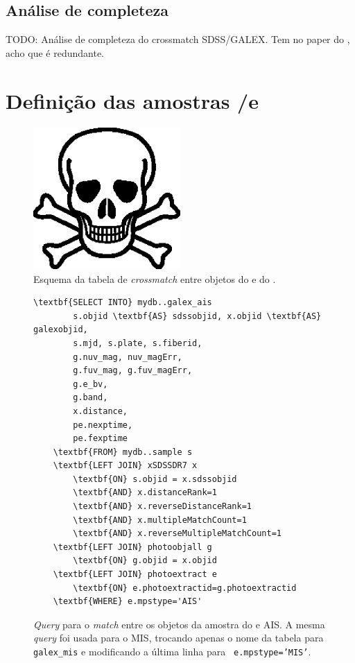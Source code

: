 \subsection{Análise de completeza}
TODO: Análise de completeza do crossmatch SDSS/GALEX. Tem no paper do
\citet{Budavari2009}, acho que é redundante.


\section{Definição das amostras \SDSS/\starlight e \galex}
\label{sec:Crossmatch:DefAmostras}


\begin{figure}
	\includegraphics[width=0.5\textwidth]{figuras/test.eps}
	\caption[Esquema da tabela de {em crossmatch} entre objetos do \galex e do
	\SDSS.]
	{Esquema da tabela de {\em crossmatch} entre objetos do \galex e do
	\SDSS.}
	\label{fig:TabelaxSDSSDR7}
\end{figure}

\begin{figure}
	\begin{Verbatim}[commandchars=\\\{\}]
	\textbf{SELECT INTO} mydb..galex_ais
		s.objid \textbf{AS} sdssobjid, x.objid \textbf{AS} galexobjid,
		s.mjd, s.plate, s.fiberid,
		g.nuv_mag, nuv_magErr,
		g.fuv_mag, g.fuv_magErr,
		g.e_bv,
		g.band,
		x.distance,
		pe.nexptime,
		pe.fexptime
	\textbf{FROM} mydb..sample s
	\textbf{LEFT JOIN} xSDSSDR7 x
		\textbf{ON} s.objid = x.sdssobjid
		\textbf{AND} x.distanceRank=1
		\textbf{AND} x.reverseDistanceRank=1
		\textbf{AND} x.multipleMatchCount=1
		\textbf{AND} x.reverseMultipleMatchCount=1
	\textbf{LEFT JOIN} photoobjall g
		\textbf{ON} g.objid = x.objid
	\textbf{LEFT JOIN} photoextract e
		\textbf{ON} e.photoextractid=g.photoextractid
	\textbf{WHERE} e.mpstype='AIS'
	\end{Verbatim}
	\caption[{\em Query} para o {\em match} entre os objetos da amostra do
	\starlight e \galex AIS.]
	{{\em Query} para o {\em match} entre os objetos da amostra do \starlight e
	\galex AIS. A mesma {\em query} foi usada para o MIS, trocando apenas o nome da
	tabela para {\tt galex\_mis} e modificando a última linha para {\tt
	e.mpstype='MIS'}.}
	\label{fig:QueryMatchAIS}
\end{figure}


